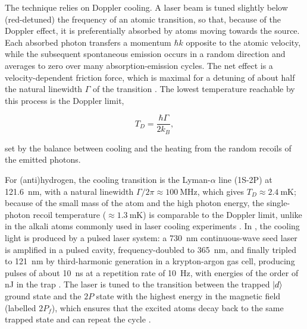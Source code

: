 The technique relies on Doppler cooling. A laser beam is tuned slightly below (red-detuned) the frequency of an atomic transition, so that, because of the Doppler effect, it is preferentially absorbed by atoms moving towards the source. Each absorbed photon transfers a momentum $\hbar k$ opposite to the atomic velocity, while the subsequent spontaneous emission occurs in a random direction and averages to zero over many absorption-emission cycles. The net effect is a velocity-dependent friction force, which is maximal for a detuning of about half the natural linewidth $\Gamma$ of the transition \cite{Evans:2022thesis}. The lowest temperature reachable by this process is the Doppler limit,

\begin{equation}
T_{D} = \frac{\hbar \Gamma}{2 k_{B}},
\end{equation}

set by the balance between cooling and the heating from the random recoils of the emitted photons.

For (anti)hydrogen, the cooling transition is the Lyman-$\alpha$ line (1S-2P) at \SI{121.6}{\nano\meter}, with a natural linewidth $\Gamma/2\pi \approx \SI{100}{\mega\hertz}$, which gives $T_{D} \approx \SI{2.4}{\milli\kelvin}$; because of the small mass of the atom and the high photon energy, the single-photon recoil temperature ($\approx \SI{1.3}{\milli\kelvin}$) is comparable to the Doppler limit, unlike in the alkali atoms commonly used in laser cooling experiments \cite{Evans:2022thesis}. In \ALPHA, the cooling light is produced by a pulsed laser system: a \SI{730}{\nano\meter} continuous-wave seed laser is amplified in a pulsed cavity, frequency-doubled to \SI{365}{\nano\meter}, and finally tripled to \SI{121}{\nano\meter} by third-harmonic generation in a krypton-argon gas cell, producing pulses of about \SI{10}{\nano\second} at a repetition rate of \SI{10}{\hertz}, with energies of the order of \si{\nano\joule} in the trap \cite{Evans:2022thesis}. The laser is tuned to the transition between the trapped $\ket{d}$ ground state and the $2P$ state with the highest energy in the magnetic field (labelled $2P_f$), which ensures that the excited atoms decay back to the same trapped state and can repeat the cycle \cite{Baker:2021ncj,Evans:2022thesis}.

